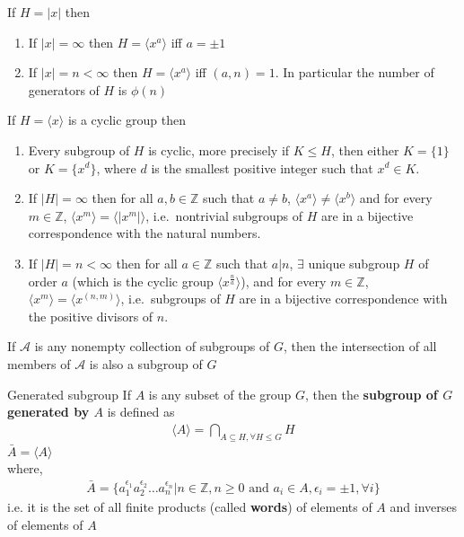 \documentclass[titlepage, 12pt]{article}
\begin{document}
\begin{proposition}{}{}
    If $H = |x|$ then
        \begin{enumerate}
            \item If $|x| = \infty$ then $H = \langle x^a\rangle$ iff $a =
                \pm 1$
            \item If $|x| = n < \infty$ then $H = \langle x^a\rangle$ iff $(a, n) =
                1$. In particular the number of generators of $H$ is $\phi(n)$
        \end{enumerate}
\end{proposition}
\begin{proposition}{}{}
    If $H = \langle x\rangle$ is a cyclic group then
        \begin{enumerate}
            \item Every subgroup of $H$ is cyclic, more precisely if $K\le H$,
                then either $K = \{1\}$ or $K = \{x^d\}$, where $d$ is the
                smallest positive integer such that $x^d\in K$.
            \item If $|H| = \infty$ then for all $a, b\in\mathbb{Z}$ such that
                $a\neq b$, $\langle x^a\rangle\neq\langle x^b\rangle$ and for
                every $m\in\mathbb{Z}$, $\langle x^m\rangle = \langle
                |x^m|\rangle$, i.e.\ nontrivial subgroups of $H$ are in a
                bijective correspondence with the natural numbers.
            \item If $|H| = n < \infty$ then for all $a\in\mathbb{Z}$ such that
                $a|n$, $\exists$ unique subgroup $H$ of order $a$ (which is the
                cyclic group $\langle x^{\frac{n}{a}}\rangle$), and for every
                $m\in\mathbb{Z}$, $\langle x^m\rangle = \langle x^{(n,
                m)}\rangle$, i.e.\ subgroups of $H$ are in a bijective
                correspondence with the positive divisors of $n$.
        \end{enumerate}
\end{proposition}
\begin{proposition}{}{}
    If $\mathcal{A}$ is any nonempty collection of subgroups of $G$, then
        the intersection of all members of $\mathcal{A}$ is also a subgroup of
        $G$
\end{proposition}
\begin{definition}{Generated subgroup}{}
    If $A$ is any subset of the group $G$, then the \textbf{subgroup of
        $G$ generated by $A$} is defined as
        \begin{gather*}
            \langle A\rangle = \bigcap_{A\subseteq H,\forall H\le G}H
        \end{gather*}
    $\bar{A} = \langle A\rangle$\\
        where,
        \begin{gather*}
            \bar{A} = \{a_1^{\epsilon_1}a_2^{\epsilon_2}\dots
                a_n^{\epsilon_n}|n\in\mathbb{Z}, n\ge 0\textrm{ and } a_i\in A,
            \epsilon_i = \pm 1, \forall i\}
        \end{gather*}
        i.e. it is the set of all finite products (called \textbf{words}) of
        elements of $A$ and inverses of elements of $A$
\end{definition}
\end{document}
